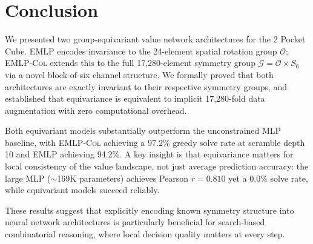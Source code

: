 \documentclass[11pt]{article}
\begin{document}
\section{Conclusion}
\label{sec:conclusion}

We presented two group-equivariant value network architectures for the
2 Pocket Cube.
\textsc{EMLP} encodes invariance to the 24-element spatial rotation group
$\mathcal{O}$; \textsc{EMLP-Col} extends this to the full 17,280-element
symmetry group $\mathcal{G} = \mathcal{O} \times S_6$ via a novel
block-of-six channel structure.
We formally proved that both architectures are exactly invariant to their
respective symmetry groups, and established that equivariance is equivalent
to implicit 17,280-fold data augmentation with zero computational overhead.

Both equivariant models substantially outperform the unconstrained \textsc{MLP}
baseline, with \textsc{EMLP-Col} achieving a 97.2\% greedy solve rate at
scramble depth 10 and \textsc{EMLP} achieving 94.2\%.
A key insight is that equivariance matters for local consistency of
the value landscape, not just average prediction accuracy: the large
\textsc{MLP} (${\sim}$169K parameters) achieves Pearson
$r = 0.810$ yet a 0.0\% solve rate, while equivariant models succeed reliably.

These results suggest that explicitly encoding known symmetry structure into
neural network architectures is particularly beneficial for search-based
combinatorial reasoning, where local decision quality matters at every step.



\end{document}
